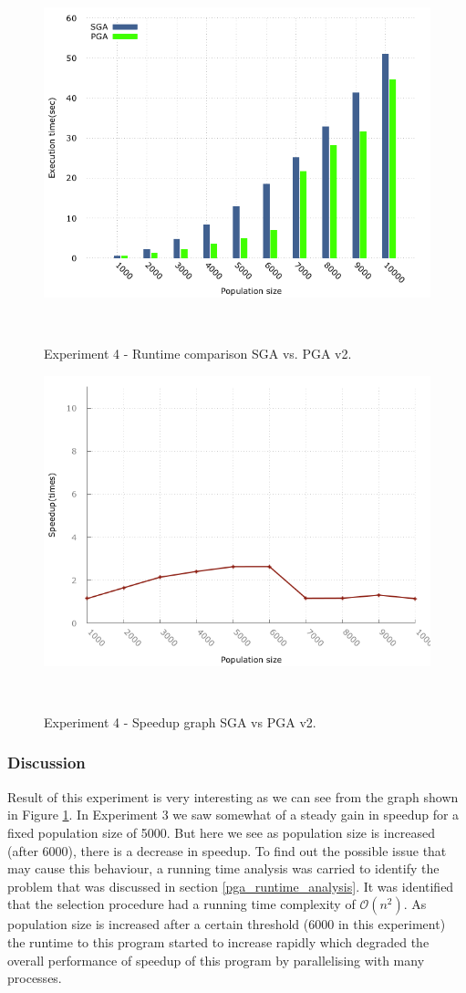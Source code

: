 \begin{figure}[H]
\begin{center}
  \includegraphics[width=.7 \linewidth]{stats_data_new/graphs/pga_global_xPop_hist.png}
  \caption{Experiment 4 - Runtime comparison SGA vs. PGA v2.}
  \end{center}\
\end{figure}

\begin{figure}[H]
\begin{center}
  \includegraphics[width=.7 \linewidth]{stats_data_new/graphs/pga_global_xPop_line.png}
  \caption{Experiment 4 - Speedup graph SGA vs PGA v2.}
  \label{fig:exp2_pgav2_graph}
  \end{center}\
\end{figure}

\subsubsection{Discussion}
Result of this experiment is very interesting as we can see from the graph shown in Figure \ref{fig:exp2_pgav2_graph}. In Experiment 3 we saw somewhat of a steady gain in speedup for a fixed population size of 5000. But here we see as population size is increased (after 6000), there is a decrease in speedup. To find out the possible issue that may cause this behaviour, a running time analysis was carried to identify the problem that was discussed in section \ref{pga_runtime_analysis}. It was identified that the selection procedure had a running time complexity of $\mathcal{O}(n^2)$. As population size is increased after a certain threshold (6000 in this experiment) the runtime to this program started to increase rapidly which degraded the overall performance of speedup of this program by parallelising with many processes.

